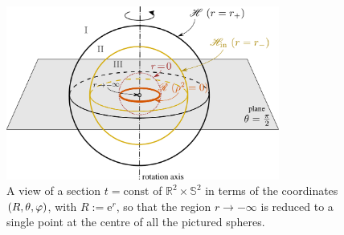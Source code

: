 \begin{figure}
\centerline{\includegraphics[width=0.8\textwidth]{ker_spher_view.pdf}}
\caption[]{\label{f:ker:spher_view} \footnotesize
A view of a section $t=\mathrm{const}$ of $\mathbb{R}^2\times\mathbb{S}^2$
in terms of the coordinates $(R,\theta,\varphi)$, with $R:=\mathrm{e}^r$,
so that the region $r\rightarrow -\infty$
is reduced to a single point at the centre of all the pictured spheres.}
\end{figure}



